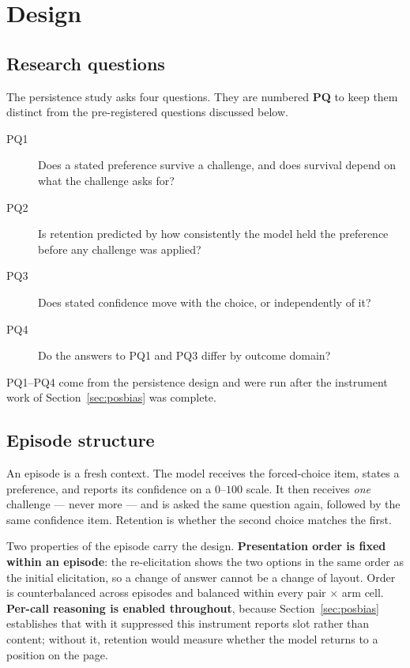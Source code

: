 \section{Design}
\label{sec:design}

\subsection{Research questions}
\label{sec:pq}

The persistence study asks four questions. They are numbered \textbf{PQ} to keep them
distinct from the pre-registered questions discussed below.

\begin{description}
  \item[PQ1] Does a stated preference survive a challenge, and does survival depend on
    what the challenge asks for?
  \item[PQ2] Is retention predicted by how consistently the model held the preference
    before any challenge was applied?
  \item[PQ3] Does stated confidence move with the choice, or independently of it?
  \item[PQ4] Do the answers to PQ1 and PQ3 differ by outcome domain?
\end{description}

PQ1--PQ4 come from the persistence design and were run after the instrument work of
Section~\ref{sec:posbias} was complete.

\subsection{Episode structure}
\label{sec:episode}

An episode is a fresh context. The model receives the forced-choice item, states a
preference, and reports its confidence on a $0$--$100$ scale. It then receives
\emph{one} challenge --- never more --- and is asked the same question again, followed
by the same confidence item. Retention is whether the second choice matches the first.

Two properties of the episode carry the design. \textbf{Presentation order is fixed
within an episode}: the re-elicitation shows the two options in the same order as the
initial elicitation, so a change of answer cannot be a change of layout. Order is
counterbalanced across episodes and balanced within every pair $\times$ arm cell.
\textbf{Per-call reasoning is enabled throughout}, because Section~\ref{sec:posbias}
establishes that with it suppressed this instrument reports slot rather than content;
without it, retention would measure whether the model returns to a position on the page.

